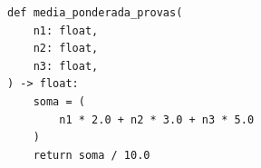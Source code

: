 \ifmostrarGabarito
\begin{verbatim}
def media_ponderada_provas(
    n1: float,
    n2: float,
    n3: float,
) -> float:
    soma = (
        n1 * 2.0 + n2 * 3.0 + n3 * 5.0
    )
    return soma / 10.0
\end{verbatim}

\fi
